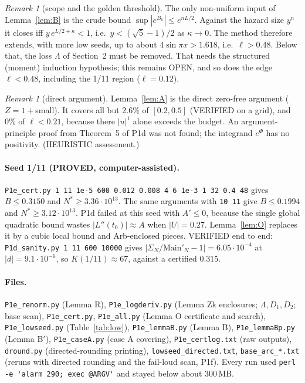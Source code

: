\documentclass[11pt]{article}
\theoremstyle{definition}\newtheorem{definition}[theorem]{Definition}
\theoremstyle{remark}\newtheorem{remark}[theorem]{Remark}
\begin{document}
\begin{remark}[scope and the golden threshold]
The only non-uniform input of Lemma~\ref{lem:B} is the crude bound $\sup|e^{B_k}|\le e^{nL/2}$. Against the hazard size $y^n$ it closes iff $y\,e^{L/2+\kappa}<1$, i.e.\ $y<(\sqrt5-1)/2$ as $\kappa\to0$. The method therefore extends, with more low seeds, up to about $4\sin\pi x>1.618$, i.e.\ $\ell>0.48$.
Below that, the loss $\Lambda$ of Section~2 must be removed. That needs the structured (moment) induction hypothesis; this remains OPEN, and so does the edge $\ell<0.48$, including the 1/11 region ($\ell=0.12$).
\end{remark}

\begin{remark}[direct argument]
Lemma~\ref{lem:A} is the direct zero-free argument ($Z=1+$small). It covers all but 2.6\% of $[0.2,0.5]$ (VERIFIED on a grid), and 0\% of $\ell<0.21$, because there $|u|^1$ alone exceeds the budget.
An argument-principle proof from Theorem~5 of P1d was not found; the integrand $e^{\Phi}$ has no positivity. (HEURISTIC assessment.)
\end{remark}

\paragraph{Seed 1/11 (PROVED, computer-assisted).} \texttt{P1e\_cert.py 1 11 1e-5 600 0.012 0.008 4 6 1e-3 1 32 0.4 48} gives $B\le0.3150$ and $N^*\ge3.36\cdot10^{13}$.
The same arguments with \texttt{10 11} give $B\le0.1994$ and $N^*\ge3.12\cdot10^{13}$.
P1d failed at this seed with $A'\le0$, because the single global quadratic bound wastes $|L''(t_0)|\approx A$ when $|U|=0.27$. Lemma~\ref{lem:O} replaces it by a cubic local bound and Arb-enclosed pieces.
VERIFIED end to end: \texttt{P1d\_sanity.py 1 11 600 10000} gives $|\Sigma_N/\mathrm{Main}'_N-1|=6.05\cdot10^{-4}$ at $|d|=9.1\cdot10^{-6}$, so $K(1/11)\approx67$, against a certified $0.315$.

\paragraph{Files.} \texttt{P1e\_renorm.py} (Lemma R), \texttt{P1e\_logderiv.py} (Lemma Zk enclosures; $\Lambda,D_1,D_2$; base scan), \texttt{P1e\_cert.py}, \texttt{P1e\_all.py} (Lemma O certificate and search), \texttt{P1e\_lowseed.py} (Table~\ref{tab:low}), \texttt{P1e\_lemmaB.py} (Lemma B), \texttt{P1e\_lemmaBp.py} (Lemma B$'$), \texttt{P1e\_caseA.py} (case A covering), \texttt{P1e\_certlog.txt} (raw outputs), \texttt{dround.py} (directed-rounding printing), \texttt{lowseed\_directed.txt}, \texttt{base\_arc\_*.txt} (reruns with directed rounding and the fail-loud scan, P1f).
Every run used \verb|perl -e 'alarm 290; exec @ARGV'| and stayed below about 300\,MB.
\end{document}
